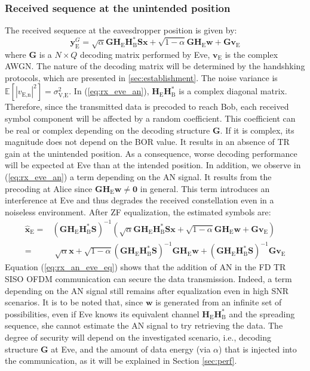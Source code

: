 \documentclass[journal,comsoc]{IEEEtran}
\newcommand{\EX}[1]{\mathbb{E} \left[#1\right]}%
\newcommand{\HE}{\textbf{H}_{\text{E}}}
\newcommand{\HB}{\textbf{H}_{\text{B}}}
\newcommand{\spread}{\textbf{S}}
\newcommand{\w}{\textbf{w}}
\begin{document}
\subsubsection{Received sequence at the unintended position}
The received sequence at the eavesdropper position is given by:
\begin{equation}
	\textbf{y}_{\text{E}}^G = \sqrt{\alpha}  \textbf{G} \HE \HB^* \spread\textbf{x} + \sqrt{1-\alpha} \textbf{G} \HE \w + \textbf{G}  \textbf{v}_\text{E}
	\label{eq:rx_eve_an}
\end{equation}
where $\textbf{G}$ is a $N \times Q$ decoding matrix performed by Eve, $\textbf{v}_\text{E}$ is the complex AWGN. The nature of the decoding matrix will be determined by the handshking protocols, which are presented in \ref{sec:establishment}. The noise variance is $\EX{|v_{\text{E,n}}|^2} = \sigma_{\text{V,E}}^2$.  In (\ref{eq:rx_eve_an}), $\HE \HB^*$ is a complex diagonal matrix. Therefore, since the transmitted data is precoded to reach Bob, each received symbol component will be affected by a random coefficient. This coefficient can be real or complex depending on the decoding structure $\textbf{G}$. If it is complex, its magnitude does not depend on the BOR value. It results in an absence of TR gain at the unintended position. As a consequence, worse decoding performance will be expected at Eve than at the intended position. In addition, we observe in (\ref{eq:rx_eve_an}) a term depending on the AN signal. It results from the precoding at Alice since $\textbf{G}\HE \w \neq \textbf{0}$ in general. This term introduces an interference at Eve and thus degrades the received constellation even in a noiseless environment. After ZF equalization, the estimated symbols are:
\begin{equation}
	\begin{split}
		\hat{\textbf{x}}_{\text{E}} =& \left(\textbf{G} \HE \HB^* \spread \right)^{-1}
		\left( \sqrt{\alpha} \textbf{G} \HE \HB^* \spread \textbf{x} +   \sqrt{1-\alpha} \textbf{G} \HE \w  +  \textbf{G}  \textbf{v}_\text{E}  \right) \\
		=& \;\sqrt{\alpha}\textbf{x} + \sqrt{1-\alpha} \left(\textbf{G} \HE \HB^* \spread \right)^{-1}  \textbf{G} \HE \w + \left(\textbf{G} \HE \HB^* \spread \right)^{-1}  \textbf{G} \textbf{v}_\text{E}
	\end{split}
	\label{eq:rx_an_eve_eq}
\end{equation}
Equation (\ref{eq:rx_an_eve_eq}) shows that the addition of AN in the FD TR SISO OFDM communication can secure the data transmission. Indeed, a term depending on the AN signal still remains after equalization even in high SNR scenarios. It is to be noted that, since $\w$ is generated from an infinite set of possibilities, even if Eve knows its equivalent channel $\HE\HB^*$ and the spreading sequence, she cannot estimate the AN signal  to try retrieving the data.  The degree of security will depend on the investigated scenario, i.e., decoding structure $\textbf{G}$ at Eve, and the amount of data energy (via $\alpha$) that is injected into the communication, as it will be explained in Section \ref{sec:perf}.
\end{document}

